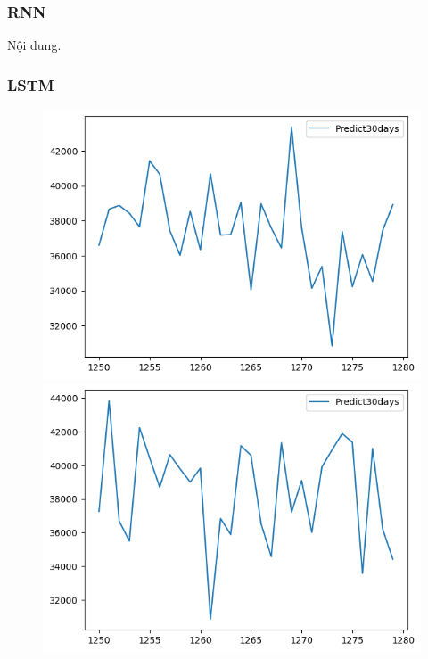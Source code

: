 \subsubsection{RNN}
Nội dung.




\subsubsection{LSTM}
\begin{figure}[H]
    \centering
    \begin{minipage}{0.15\textwidth}
    \centering
    \includegraphics[width=1\textwidth]{resources/chapter-5/predicted/BIDV_ML_7_3_next30days.png}
    \end{minipage}
    \hfill
    \begin{minipage}{0.15\textwidth}
    \centering
    \includegraphics[width=1\textwidth]{resources/chapter-5/predicted/BIDV_ML_8_2_next30days.png}

\end{minipage}
\end{figure}
